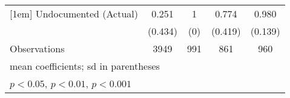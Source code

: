 \begin{table}[htbp]
\begin{tabular}{l*{4}{c}}
[1em]
Undocumented (Actual)&       0.251         &           1         &       0.774         &       0.980         \\
                    &     (0.434)         &         (0)         &     (0.419)         &     (0.139)         \\
\hline
Observations        &        3949         &         991         &         861         &         960         \\
\hline\hline
\multicolumn{5}{l}{\footnotesize mean coefficients; sd in parentheses}\\
\multicolumn{5}{l}{\footnotesize \sym{*} \(p<0.05\), \sym{**} \(p<0.01\), \sym{***} \(p<0.001\)}\\
\end{tabular}
\end{table}
